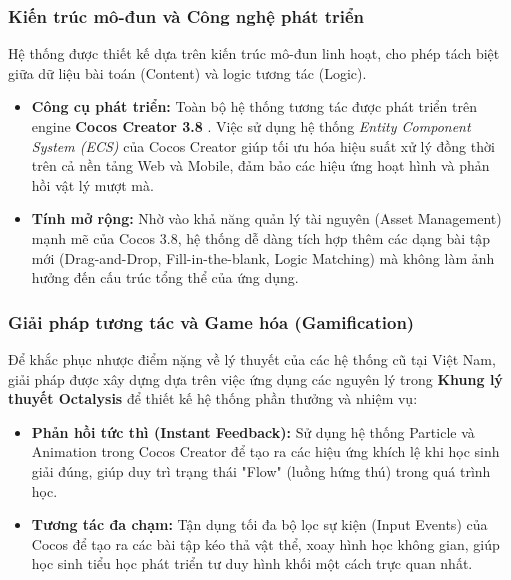 \subsubsection{Kiến trúc mô-đun và Công nghệ phát triển}
Hệ thống được thiết kế dựa trên kiến trúc mô-đun linh hoạt, cho phép tách biệt giữa dữ liệu bài toán (Content) và logic tương tác (Logic). 

\begin{itemize}
	\item \textbf{Công cụ phát triển:} Toàn bộ hệ thống tương tác được phát triển trên engine \textbf{Cocos Creator 3.8} \cite{cocoscreator38}. Việc sử dụng hệ thống \textit{Entity Component System (ECS)} của Cocos Creator giúp tối ưu hóa hiệu suất xử lý đồng thời trên cả nền tảng Web và Mobile, đảm bảo các hiệu ứng hoạt hình và phản hồi vật lý mượt mà.
	\item \textbf{Tính mở rộng:} Nhờ vào khả năng quản lý tài nguyên (Asset Management) mạnh mẽ của Cocos 3.8, hệ thống dễ dàng tích hợp thêm các dạng bài tập mới (Drag-and-Drop, Fill-in-the-blank, Logic Matching) mà không làm ảnh hưởng đến cấu trúc tổng thể của ứng dụng.
\end{itemize}

\subsubsection{Giải pháp tương tác và Game hóa (Gamification)}
Để khắc phục nhược điểm nặng về lý thuyết của các hệ thống cũ tại Việt Nam, giải pháp được xây dựng dựa trên việc ứng dụng các nguyên lý trong \textbf{Khung lý thuyết Octalysis} \cite{chou2015} để thiết kế hệ thống phần thưởng và nhiệm vụ:
\begin{itemize}
	\item \textbf{Phản hồi tức thì (Instant Feedback):} Sử dụng hệ thống Particle và Animation trong Cocos Creator để tạo ra các hiệu ứng khích lệ khi học sinh giải đúng, giúp duy trì trạng thái "Flow" (luồng hứng thú) trong quá trình học.
	\item \textbf{Tương tác đa chạm:} Tận dụng tối đa bộ lọc sự kiện (Input Events) của Cocos để tạo ra các bài tập kéo thả vật thể, xoay hình học không gian, giúp học sinh tiểu học phát triển tư duy hình khối một cách trực quan nhất.
\end{itemize}




